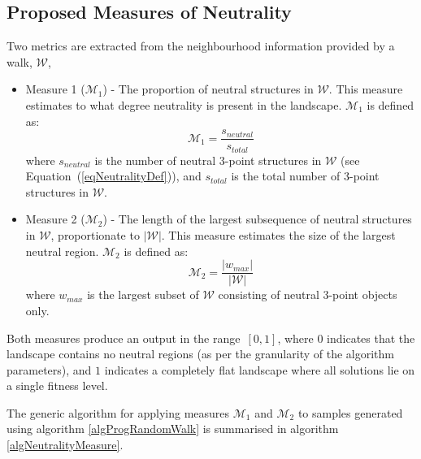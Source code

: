 \documentclass[conference]{IEEEtran}
\begin{document}
\subsection{Proposed Measures of Neutrality}
\label{neutralityMetrics}
Two metrics are extracted from the neighbourhood information provided by a walk, $\mathcal{W}$,
\begin{itemize}
	\item Measure 1 (${\mathcal{M}_1}$) - The proportion of neutral structures in $\mathcal{W}$. This measure estimates to what degree neutrality is present in the landscape. ${\mathcal{M}_1}$ is defined as:
          \begin{equation}
            \label{eqNeutralityM1}
	    {\mathcal{M}_1} = \frac{s_{neutral}}{s_{total}}
          \end{equation}
where $s_{neutral}$ is the number of neutral 3-point structures in $\mathcal{W}$ (see Equation~(\ref{eqNeutralityDef})), and $s_{total}$ is the total number of 3-point structures in $\mathcal{W}$.
	\item Measure 2 (${\mathcal{M}_2}$) - The length of the largest subsequence of neutral structures in $\mathcal{W}$, proportionate to $\lvert \mathcal{W} \rvert$. This measure estimates the size of the largest neutral region. ${\mathcal{M}_2}$ is defined as:
          \begin{equation}
            \label{eqNeutralityM2}
	    {\mathcal{M}_2} = \frac{\lvert w_{max} \rvert}{\lvert \mathcal{W} \rvert}
          \end{equation}
where $w_{max}$ is the largest subset of $\mathcal{W}$ consisting of neutral 3-point objects only.
\end{itemize}

Both measures produce an output in the range~$[0,1]$, where $0$ indicates that the landscape contains no neutral regions (as per the granularity of the algorithm parameters), and $1$ indicates a completely flat landscape where all solutions lie on a single fitness level.

The generic algorithm for applying measures ${\mathcal{M}_1}$ and ${\mathcal{M}_2}$ to samples generated using algorithm \ref{algProgRandomWalk} is summarised in algorithm \ref{algNeutralityMeasure}.
\end{document}
